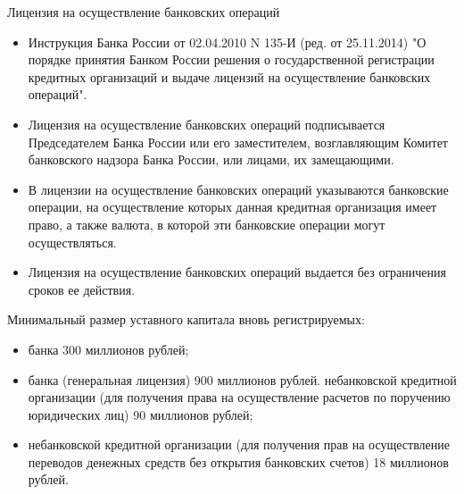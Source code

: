 \documentclass[_Banking_p1.tex]{subfiles}
\begin{document}
\begin{frame}[allowframebreaks]{Лицензия на осуществление банковских операций}
\begin{itemize}
\item
Инструкция Банка России от 02.04.2010 N 135-И (ред. от 25.11.2014) "О порядке принятия Банком России решения о государственной регистрации кредитных организаций и выдаче лицензий на осуществление банковских операций".
\item
Лицензия на осуществление банковских операций подписывается Председателем Банка России или его заместителем, возглавляющим Комитет банковского надзора Банка России, или лицами, их замещающими. 
\pagebreak
\item
В лицензии на осуществление банковских операций указываются банковские операции, на осуществление которых данная кредитная организация имеет право, а также валюта, в которой эти банковские операции могут осуществляться.
\item
Лицензия на осуществление банковских операций выдается без ограничения сроков ее действия.
\end{itemize}
\end{frame}

\begin{frame}{Минимальный размер уставного капитала вновь регистрируемых:}
\begin{itemize}
\item
банка 300 миллионов рублей;
\item
банка (генеральная лицензия) 900 миллионов рублей.
небанковской кредитной организации (для получения права на осуществление расчетов по поручению юридических лиц) 90 миллионов рублей;
\item
небанковской кредитной организации (для получения прав на осуществление переводов денежных средств без открытия банковских счетов) 18 миллионов рублей.
\end{itemize}
\end{frame}
\end{document}
